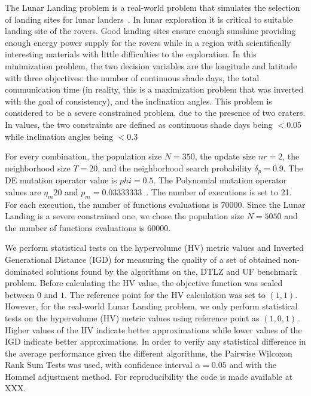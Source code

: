 The Lunar Landing problem is a real-world problem that simulates the selection of landing sites for lunar landers~\citep{MoonOrbitingSatellite2015}. In lunar exploration it is critical to suitable landing site of the rovers. Good landing sites ensure enough sunshine providing enough energy power supply for the rovers while in a region with scientifically interesting materials with little difficulties to the exploration. In this minimization problem, the two decision variables are the longitude and latitude with three objectives: the number of continuous shade days, the total communication time (in reality, this is a maximization problem that was inverted with the goal of consistency), and the inclination angles. This problem is considered to be a severe constrained problem, due to the presence of two craters. In values, the two constraints are defined as continuous shade days being $ < 0.05$ while inclination angles being $<0.3$

For every combination, the population size $N = 350$, the update size $nr = 2$, the neighborhood size $T = 20$, and the neighborhood search probability $\delta_p = 0.9$. The DE mutation operator value is $phi=0.5$. The Polynomial mutation operator values are $\eta_m 20$ and $p_m = 0.03333333$~\cite{campelo2018moeadr}. The number of executions is set to 21. For each execution, the number of functions evaluations is 70000. Since the Lunar Landing is a severe constrained one, we chose the population size $N = 5050$ and the number of functions evaluations is 60000. 

We perform statistical tests on the hypervolume (HV) metric values and Inverted Generational Distance (IGD) for measuring the quality of a set of obtained non-dominated solutions found by the algorithms on the, DTLZ and UF benchmark problem. Before calculating the HV value, the objective function was scaled between $0$ and $1$. The reference point for the HV calculation was set to $(1, 1)$. However, for the real-world Lunar Landing problem, we only perform statistical tests on the hypervolume (HV) metric values using reference point as $(1, 0, 1)$. Higher values of the HV indicate better approximations while lower values of the IGD indicate better approximations. In order to verify any statistical difference in the average performance given the different algorithms, the Pairwise Wilcoxon Rank Sum Tests was used, with confidence interval $\alpha = 0.05$ and with the Hommel adjustment method. For reproducibility the code is made available at XXX.

